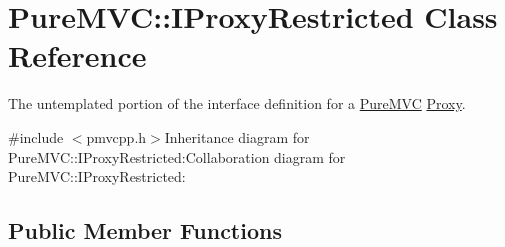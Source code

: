 \hypertarget{class_pure_m_v_c_1_1_i_proxy_restricted}{
\section{PureMVC::IProxyRestricted Class Reference}
\label{class_pure_m_v_c_1_1_i_proxy_restricted}
}


The untemplated portion of the interface definition for a \hyperlink{namespace_pure_m_v_c}{PureMVC} \hyperlink{class_pure_m_v_c_1_1_proxy}{Proxy}.  


{\ttfamily \#include $<$pmvcpp.h$>$}Inheritance diagram for PureMVC::IProxyRestricted:Collaboration diagram for PureMVC::IProxyRestricted:\subsection*{Public Member Functions}
